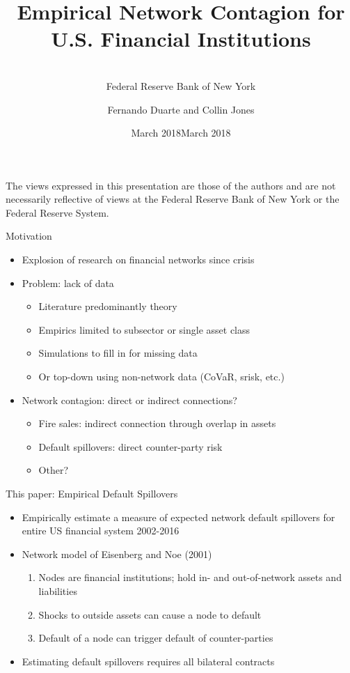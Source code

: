 \documentclass[12pt,envcountsect, leqno,xcolor=dvipsnames]{beamer}
\title[]{}
\author[]{
\\
{\footnotesize Federal Reserve Bank of New York}
}
\date{March 2018}
\title[Empirical Network Contagion]{Empirical Network Contagion for U.S. Financial Institutions}
\author[Duarte and Jones]{Fernando Duarte and Collin Jones}
\institute[NY Fed]{Federal Reserve Bank of New York and Federal Reserve Bank of New York}
\date{March 2018}
\newcommand{\bi}{\begin{itemize}}
\newcommand{\ei}{\end{itemize}}
\newcommand{\bn}{\begin{enumerate}}
\newcommand{\en}{\end{enumerate}}
\begin{document}
\begin{frame}[plain]

\titlepage


\begin{scriptsize} \begin{center}
The views expressed in this presentation are those of the authors and are
not necessarily reflective of views at the Federal Reserve Bank of
New York or the Federal Reserve System.
\end{center} \end{scriptsize}

\end{frame}

\setcounter{framenumber}{0}



\begin{frame}{Motivation} 

\bi
\item Explosion of research on financial networks since crisis
\item Problem: lack of data
	\bi
	\item Literature predominantly theory
	\item Empirics limited to subsector or single asset class
	\item Simulations to fill in for missing data
	\item Or top-down using non-network data (CoVaR, srisk, etc.)
	\ei 
\item Network contagion: direct or indirect connections?
	\bi
	\item Fire sales: indirect connection through overlap in assets
	\item Default spillovers: direct counter-party risk
	\item Other?
	\ei
\ei

\end{frame}

\begin{frame}{This paper: Empirical Default Spillovers} 
\bi
\item  Empirically  estimate  a  measure  of  expected network default spillovers for entire US financial system 2002-2016
\item Network model of Eisenberg and Noe (2001)
	\bn
	\item Nodes are financial institutions; hold in- and out-of-network assets and liabilities
	\item Shocks to outside assets can cause a node to default
	\item Default of a node can trigger default of counter-parties
	\en 
\item Estimating default spillovers requires all bilateral contracts
\ei
\end{frame}
\end{document}
